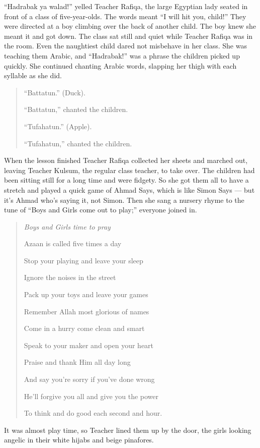 \documentclass[12pt]{memoir}
\begin{document}
“Hadrabak ya walad!” yelled Teacher Rafiqa,
the large Egyptian lady seated in front of a class of five-year-olds.
The words meant “I will hit you, child!”
They were directed at a boy climbing over the back of another child.
The boy knew she meant it and got down.
The class sat still and quiet while Teacher Rafiqa was in the room.
Even the naughtiest child dared not misbehave in her class.
She was teaching them Arabic, and “Hadrabak!” was a phrase
the children picked up quickly.
She continued chanting Arabic words,
slapping her thigh with each syllable as she did.

\begin{quote}
“Battatun.” (Duck).

“Battatun,” chanted the children.

“Tufahatun.” (Apple).

“Tufahatun,” chanted the children.
\end{quote}

When the lesson finished Teacher Rafiqa collected her sheets and marched out,
leaving Teacher Kulsum, the regular class teacher, to take over.
The children had been sitting still for a long time and were fidgety.
So she got them all to have a stretch and played a quick game of Ahmad Says,
which is like Simon Says — but it’s Ahmad who’s saying it, not Simon.
Then she sang a nursery rhyme to the tune of
“Boys and Girls come out to play;” everyone joined in.

\begin{quote}
\itshape
Boys and Girls  time to pray

Azaan is called five times a day

Stop your playing and leave your sleep

Ignore the noises in the street

Pack up your toys and leave your games

Remember Allah most glorious of names

Come in a hurry come clean and smart

Speak to your maker and open your heart

Praise and thank Him all day long

And say you’re sorry if you’ve done wrong

He’ll forgive you all and give you the power

To think and do good each second and hour.
\end{quote}

It was almost play time,
so Teacher  lined them up by the door,
the girls looking angelic in their white hijabs and beige pinafores.
\end{document}
